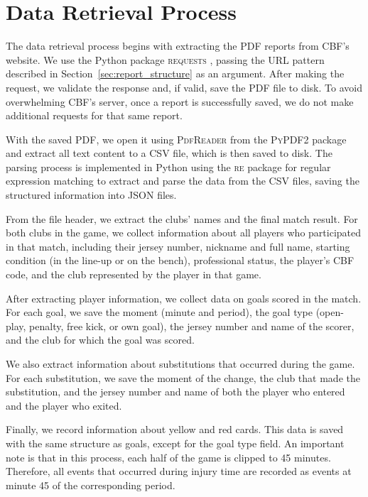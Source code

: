 \section{Data Retrieval Process}
\label{sec:retrieval}

The data retrieval process begins with extracting the PDF reports from CBF's website.
We use the Python package \textsc{requests} \cite{requests}, passing the URL pattern described in Section~\ref{sec:report_structure} as an argument.
After making the request, we validate the response and, if valid, save the PDF file to disk.
To avoid overwhelming CBF's server, once a report is successfully saved, we do not make additional requests for that same report.

With the saved PDF, we open it using \textsc{PdfReader} from the \textsc{PyPDF2} package \cite{pypdf2} and extract all text content to a CSV file, which is then saved to disk.
The parsing process is implemented in Python using the \textsc{re} package \cite{re} for regular expression matching to extract and parse the data from the CSV files, saving the structured information into JSON files.

From the file header, we extract the clubs' names and the final match result.
For both clubs in the game, we collect information about all players who participated in that match, including their jersey number, nickname and full name, starting condition (in the line-up or on the bench), professional status, the player's CBF code, and the club represented by the player in that game.

After extracting player information, we collect data on goals scored in the match.
For each goal, we save the moment (minute and period), the goal type (open-play, penalty, free kick, or own goal), the jersey number and name of the scorer, and the club for which the goal was scored.

We also extract information about substitutions that occurred during the game.
For each substitution, we save the moment of the change, the club that made the substitution, and the jersey number and name of both the player who entered and the player who exited.

Finally, we record information about yellow and red cards.
This data is saved with the same structure as goals, except for the goal type field.
An important note is that in this process, each half of the game is clipped to 45 minutes.
Therefore, all events that occurred during injury time are recorded as events at minute 45 of the corresponding period.

